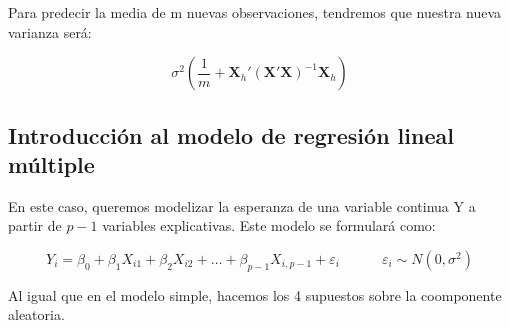 Para predecir la media de m nuevas observaciones, tendremos que nuestra nueva varianza será:

$$
\sigma^2\left(\frac{1}{m}+\mathbf{X}_h'(\mathbf{X'X})^{-1}\mathbf{X}_h\right)
$$

\subsection{Introducción al modelo de regresión lineal múltiple}

En este caso, queremos modelizar la esperanza de una variable continua Y a partir de $p-1$ variables explicativas. Este modelo se formulará como:

$$
Y_i=\beta_0+\beta_1X_{i1}+\beta_2X_{i2}+\dots+\beta_{p-1}X_{i,p-1}+\varepsilon_i\quad\quad\quad\varepsilon_i\sim N(0,\sigma^2)
$$

Al igual que en el modelo simple, hacemos los 4 supuestos sobre la coomponente aleatoria.


